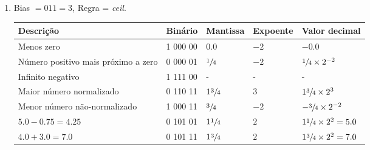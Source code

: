 \begin{enumerate}
    \item Bias $= 011 = 3$, Regra = {\color{red}\textit{ceil}}. 
    \begin{table}[H]
        \begin{tabular}{|l|l|l|l|l|}
            \hline
            \textbf{Descrição}  &
            \textbf{Binário}    &
            \textbf{Mantissa}   &
            \textbf{Expoente}   &
            \textbf{Valor decimal} \\\hline
            Menos zero 
            & 1 000 00 & $0.0$ & $-2$ & $-0.0$
            \\\hline
            Número positivo mais próximo a zero
            & 0 000 01 & $\sfrac{1}{4}$ & $-2$ & $\sfrac{1}{4}\times 2^{-2}$
            \\\hline
            Infinito negativo
            & 1 111 00 & -  & - & - 
            \\\hline
            Maior número normalizado
            & 0 110 11 & $1\sfrac{3}{4}$ & $3$ & $1\sfrac{3}{4}\times 2^3$
            \\\hline
            Menor número não-normalizado
            & 1 000 11 & $\sfrac{3}{4}$ & $-2$ & $-\sfrac{3}{4}\times 2^{-2}$
            \\\hline\rowcolor{red!25}
            $5.0 - 0.75 = 4.25$
            & 0 101 01 & $1\sfrac{1}{4}$ & $2$ & $1\sfrac{1}{4}\times 2^2 = 5.0$
            \\\hline
            $4.0 + 3.0 = 7.0$
            & 0 101 11 & $1\sfrac{3}{4}$ & $2$ & $1\sfrac{3}{4}\times 2^{2} = 7.0$
            \\\hline
        \end{tabular}
    \end{table}


\end{enumerate}
